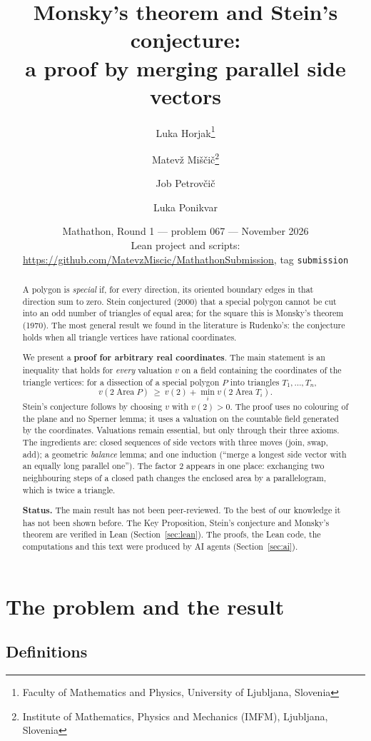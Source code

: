 \documentclass[11pt]{article}
\title{Monsky's theorem and Stein's conjecture:\\
a proof by merging parallel side vectors}
\author{Luka Horjak\thanks{Faculty of Mathematics and Physics, University of Ljubljana, Slovenia}
\and Matevž Miščič\footnotemark[1]\thanks{Institute of Mathematics, Physics and Mechanics (IMFM), Ljubljana, Slovenia}
\and Job Petrovčič\footnotemark[1]
\and Luka Ponikvar\footnotemark[1]}
\date{Mathathon, Round 1 --- problem 067 --- November 2026\\
\small Lean project and scripts: \url{https://github.com/MatevzMiscic/MathathonSubmission}, tag \texttt{submission}}
\theoremstyle{definition}
\newcommand{\Area}{\operatorname{Area}}
\begin{document}
\sloppy
\maketitle

\begin{abstract}
A polygon is \emph{special} if, for every direction, its oriented boundary edges in that direction
sum to zero. Stein conjectured (2000) that a special polygon cannot be cut into an odd number of
triangles of equal area; for the square this is Monsky's theorem (1970). The most general result we
found in the literature is Rudenko's: the conjecture holds when all triangle vertices have rational
coordinates.

We present a \textbf{proof for arbitrary real coordinates}. The main statement is an
inequality that holds for \emph{every} valuation $v$ on a field containing the coordinates of the
triangle vertices: for a dissection of a special polygon $P$ into triangles $T_1,\dots,T_n$,
\[ v(2\Area P)\ \ge\ v(2)+\min_iv(2\Area T_i). \]
Stein's conjecture follows by choosing $v$ with $v(2)>0$. The proof uses no colouring of the plane
and no Sperner lemma; it uses a valuation on the countable field generated by the coordinates.
Valuations remain essential, but only through their three axioms. The
ingredients are: closed sequences of side vectors with three moves (join, swap, add); a geometric
\emph{balance} lemma; and one induction (``merge a longest side vector with an equally long
parallel one''). The factor $2$ appears in one place: exchanging two neighbouring steps of a closed
path changes the enclosed area by a parallelogram, which is twice a triangle.

\textbf{Status.} The main result has not been peer-reviewed. To the best of our knowledge it has not
been shown before. The Key Proposition, Stein's conjecture and Monsky's theorem are verified in Lean
(Section~\ref{sec:lean}). The proofs, the Lean code, the computations and this text were
produced by AI agents (Section~\ref{sec:ai}).
\end{abstract}

\tableofcontents

\section{The problem and the result}\label{sec:intro}

\subsection{Definitions}
\end{document}
